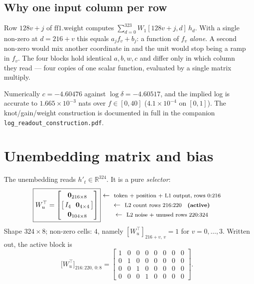\documentclass[11pt]{article}
\newcommand{\R}{\mathbb{R}}
\newcommand{\rowlab}[1]{\ \leftarrow\ \text{\footnotesize #1}}
\begin{document}
\subsection{Why one input column per row}
Row $128v{+}j$ of $\mathrm{ff1.weight}$ computes $\sum_{d=0}^{323}W_{1}[128v{+}j,d]\,h_d$. With a
single non-zero at $d=216{+}v$ this equals $a_j f_v+b_j$: a function of $f_v$ \emph{alone}. A
second non-zero would mix another coordinate in and the unit would stop being a ramp in $f_v$.
The four blocks hold identical $a,b,w,c$ and differ only in which column they read --- four copies
of one scalar function, evaluated by a single matrix multiply.

\medskip
Numerically $c=-4.60476$ against $\log\delta=-4.60517$, and the implied log is accurate to
$1.665\times10^{-3}$ nats over $f\in[0,40]$ ($4.1\times10^{-4}$ on $[0,1]$). The knot/gain/weight
construction is documented in full in the companion \texttt{log\_readout\_construction.pdf}.

\section{Unembedding matrix and bias}

The unembedding reads $h'_t\in\R^{324}$. It is a pure \emph{selector}:
\begin{equation}
\boxed{
W_u^\top=
\begin{bmatrix}
\bm{0}_{216\times8}\\[2pt]
\bigl[\,I_4\ \ \bm{0}_{4\times4}\,\bigr]\\[2pt]
\bm{0}_{104\times8}
\end{bmatrix}}
\begin{matrix}
\rowlab{token $+$ position $+$ L1 output, rows $0{:}216$}\\[2pt]
\rowlab{L2 count rows $216{:}220$ \ \ \textbf{(active)}}\\[2pt]
\rowlab{L2 noise $+$ unused rows $220{:}324$}
\end{matrix}
\end{equation}
Shape $324\times8$; non-zero cells: $4$, namely $[W_u^\top]_{216+v,\,v}=1$ for $v=0,\dots,3$.
Written out, the active block is
\begin{equation}
\bigl[W_u^\top\bigr]_{216:220,\ 0:8}=
\begin{bmatrix}
1&0&0&0&0&0&0&0\\
0&1&0&0&0&0&0&0\\
0&0&1&0&0&0&0&0\\
0&0&0&1&0&0&0&0
\end{bmatrix}.
\end{equation}
\end{document}
